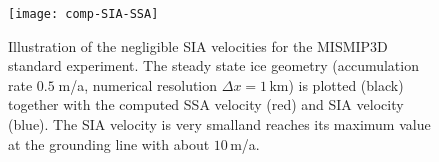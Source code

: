 \begin{figure}[ht]
\centering
\texttt{[image: comp-SIA-SSA]}
\caption{Illustration of the negligible SIA velocities for the MISMIP3D standard experiment. The steady state ice geometry (accumulation rate $0.5\;$m/a, numerical resolution $\Delta x = 1\,$km) is plotted (black) together with the computed SSA velocity (red) and SIA velocity (blue). The SIA velocity is very smalland reaches its maximum value at the grounding line with about $10\,$m/a.}
\label{fig:compSIASSA}
\end{figure}

